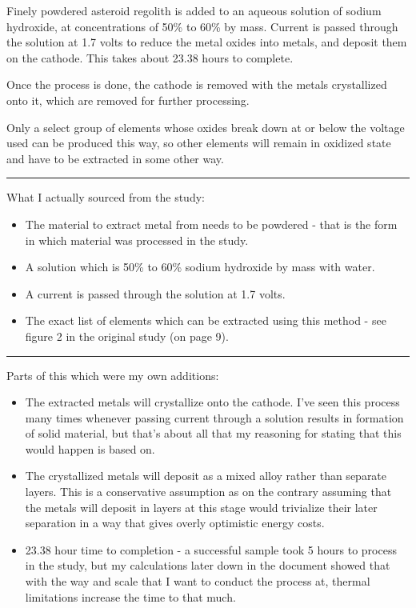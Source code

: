 \documentclass[a4paper]{article}
\begin{document}
	Finely powdered asteroid regolith is added to an aqueous solution of sodium hydroxide, at concentrations of 50\% to 60\% by mass.
	Current is passed through the solution at 1.7 volts to reduce the metal oxides into metals, and deposit them on the cathode.
	This takes about 23.38 hours to complete.
	
	\medskip
	
	Once the process is done, the cathode is removed with the metals crystallized onto it, which are removed for further processing.
	
	\medskip
	
	
	Only a select group of elements whose oxides break down at or below the voltage used can be produced this way, so other elements will remain in oxidized state and have to be extracted in some other way.
	
	\noindent\rule{\linewidth}{0.5pt}
	
	What I actually sourced from the study:
	
	\begin{itemize}
		\item The material to extract metal from needs to be powdered - that is the form in which material was processed in the study.
		
		\item A solution which is 50\% to 60\% sodium hydroxide by mass with water.
		
		\item A current is passed through the solution at 1.7 volts.
		
		\item The exact list of elements which can be extracted using this method - see figure 2 in the original study (on page 9).
	\end{itemize}
	
	\noindent\rule{\linewidth}{0.5pt}
	
	Parts of this which were my own additions:
	
	\begin{itemize}
		\item The extracted metals will crystallize onto the cathode. I've seen this process many times whenever passing current through a solution results in formation of solid material, but that's about all that my reasoning for stating that this would happen is based on.
		
		\item The crystallized metals will deposit as a mixed alloy rather than separate layers. This is a conservative assumption as on the contrary assuming that the metals will deposit in layers at this stage would trivialize their later separation in a way that gives overly optimistic energy costs.
		
		\item 23.38 hour time to completion - a successful sample took 5 hours to process in the study, but my calculations later down in the document showed that with the way and scale that I want to conduct the process at, thermal limitations increase the time to that much.
	\end{itemize}
    
\end{document}
